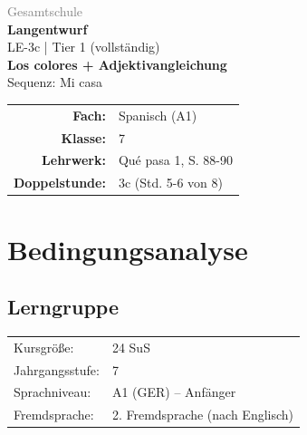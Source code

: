 \documentclass[11pt,a4paper]{article}
\newcommand{\fach}{Spanisch}
\newcommand{\jahrgangsstufe}{7}
\newcommand{\schulart}{Gesamtschule}
\newcommand{\stundenthema}{Los colores + Adjektivangleichung}
\newcommand{\reihenthema}{Mi casa}
\newcommand{\stundennummer}{3c}
\newcommand{\lehrwerk}{Qué pasa 1}
\newcommand{\lehrwerkseite}{S. 88-90}
\newcommand{\lerngruppengroesse}{24}
\begin{document}
\begin{titlepage}
    \centering
    \vspace*{2cm}
    {\large\textcolor{gray}{\schulart}}\\[2cm]
    {\Huge\textcolor{fach}{\textbf{Langentwurf}}}\\[0.5cm]
    {\large LE-\stundennummer{} | Tier 1 (vollständig)}\\[2cm]
    {\LARGE\textbf{\stundenthema}}\\[0.5cm]
    {\large Sequenz: \reihenthema}\\[2cm]
    \begin{tabular}{rl}
        \textbf{Fach:} & \fach{} (A1) \\[0.3cm]
        \textbf{Klasse:} & \jahrgangsstufe \\[0.3cm]
        \textbf{Lehrwerk:} & \lehrwerk, \lehrwerkseite \\[0.3cm]
        \textbf{Doppelstunde:} & \stundennummer{} (Std. 5-6 von 8) \\[0.3cm]
    \end{tabular}
    \vfill
\end{titlepage}

\tableofcontents
\newpage

\section{Bedingungsanalyse}

\subsection{Lerngruppe}
\begin{tabular}{ll}
    Kursgröße: & \lerngruppengroesse{} SuS \\
    Jahrgangsstufe: & \jahrgangsstufe \\
    Sprachniveau: & A1 (GER) -- Anfänger \\
    Fremdsprache: & 2. Fremdsprache (nach Englisch) \\
\end{tabular}
\end{document}
